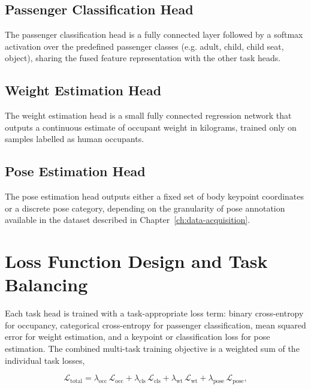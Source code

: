 \subsection{Passenger Classification Head}
\label{sec:classification-head}
The passenger classification head is a fully connected layer followed by
a softmax activation over the predefined passenger classes (e.g. adult,
child, child seat, object), sharing the fused feature representation with
the other task heads.

\subsection{Weight Estimation Head}
\label{sec:weight-head}
The weight estimation head is a small fully connected regression network
that outputs a continuous estimate of occupant weight in kilograms,
trained only on samples labelled as human occupants.

\subsection{Pose Estimation Head}
\label{sec:pose-head}
The pose estimation head outputs either a fixed set of body keypoint
coordinates or a discrete pose category, depending on the granularity of
pose annotation available in the dataset described in
Chapter~\ref{ch:data-acquisition}.

\section{Loss Function Design and Task Balancing}
\label{sec:loss-function-design}
Each task head is trained with a task-appropriate loss term: binary
cross-entropy for occupancy, categorical cross-entropy for passenger
classification, mean squared error for weight estimation, and a
keypoint or classification loss for pose estimation. The combined
multi-task training objective is a weighted sum of the individual task
losses,

\begin{equation}
\label{eq:multitask-loss}
\mathcal{L}_{\text{total}} = \lambda_{\text{occ}} \, \mathcal{L}_{\text{occ}}
+ \lambda_{\text{cls}} \, \mathcal{L}_{\text{cls}}
+ \lambda_{\text{wt}} \, \mathcal{L}_{\text{wt}}
+ \lambda_{\text{pose}} \, \mathcal{L}_{\text{pose}},
\end{equation}

